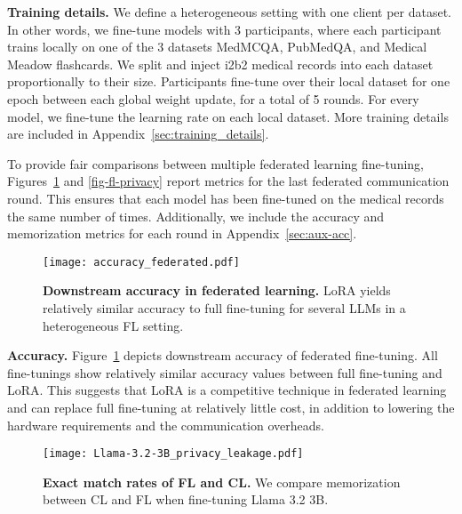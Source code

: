 \textbf{Training details.} We define a heterogeneous setting with one client per dataset. In other words, we fine-tune models with 3 participants, where each participant trains locally on one of the 3 datasets MedMCQA, PubMedQA, and Medical Meadow flashcards. We split and inject i2b2 medical records into each dataset proportionally to their size. Participants fine-tune over their local dataset for one epoch between each global weight update, for a total of 5 rounds. For every model, we fine-tune the learning rate on each local dataset. More training details are included in Appendix~\ref{sec:training_details}.

To provide fair comparisons between multiple federated learning fine-tuning, Figures~\ref{fig-fl-accuracy} and \ref{fig-fl-privacy} report metrics for the last federated communication round. This ensures that each model has been fine-tuned on the medical records the same number of times. Additionally, we include the accuracy and memorization metrics for each round in Appendix~\ref{sec:aux-acc}.

\begin{figure}[ht]
\begin{center}
\centerline{\texttt{[image: accuracy\_federated.pdf]}}
\caption{\textbf{Downstream accuracy in federated learning.} LoRA yields relatively similar accuracy to full fine-tuning for several LLMs in a heterogeneous FL setting.}
\label{fig-fl-accuracy}
\end{center}
\end{figure}

\textbf{Accuracy.} Figure~\ref{fig-fl-accuracy} depicts downstream accuracy of federated fine-tuning. All fine-tunings show relatively similar accuracy values between full fine-tuning and LoRA. This suggests that LoRA is a competitive technique in federated learning and can replace full fine-tuning at relatively little cost, in addition to lowering the hardware requirements and the communication overheads.


\begin{figure}[ht]
\begin{center}
\centerline{\texttt{[image: Llama-3.2-3B\_privacy\_leakage.pdf]}}
\caption{\textbf{Exact match rates of FL and CL.} We compare memorization between CL and FL when fine-tuning Llama 3.2 3B.}
\label{fig-fl-remaining-mem}
\end{center}
\vskip -0.2in
\end{figure}

